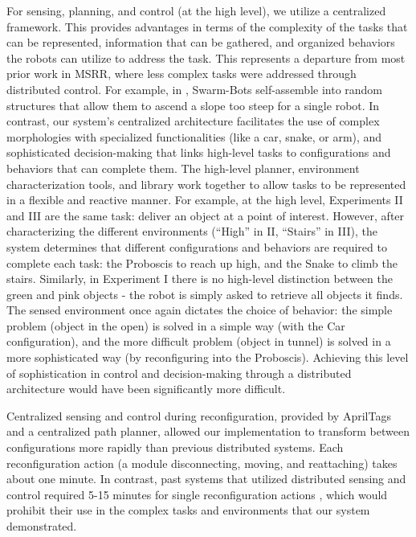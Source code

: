 \documentclass[12pt]{article}
\begin{document}
For sensing, planning, and control (at the high level), we utilize a centralized framework.  This provides advantages in terms of the complexity of the tasks that can be represented, information that can be gathered, and organized behaviors the robots can utilize to address the task.
This represents a departure from most prior work in MSRR, where less complex tasks
were addressed through distributed control.  For example, in \cite{o2010self}, Swarm-Bots self-assemble into random structures that allow them to ascend a slope too steep for a single robot.  In contrast, our system's centralized architecture facilitates the use of complex morphologies with specialized functionalities (like a car, snake, or arm), and sophisticated decision-making that links high-level tasks to configurations and behaviors that can complete them.
The high-level planner, environment characterization tools, and library work together to allow tasks to be represented in a flexible and reactive manner. For example, at the high level, Experiments II and III are the same task: deliver an object at a point of interest.  However, after characterizing the different environments (``High'' in II, ``Stairs'' in III), the system determines that different configurations and behaviors are required to complete each task:  the Proboscis to reach up high, and the Snake to climb the stairs.  
Similarly, in Experiment I there is no high-level distinction between the green and pink objects - the robot is simply asked to retrieve all objects it finds.  The sensed environment once again dictates the choice of behavior: the simple problem (object in the open) is solved in a simple way (with the Car configuration), and the more difficult problem (object in tunnel) is solved in a more sophisticated way (by reconfiguring into the Proboscis).  Achieving this level of sophistication in control and decision-making through a distributed architecture would have been significantly more difficult.

Centralized sensing and control during reconfiguration, provided by AprilTags and a centralized path planner, allowed our implementation to transform between configurations more rapidly than previous distributed systems. 
Each reconfiguration action (a module disconnecting, moving, and reattaching) takes about one minute.  In contrast, past systems that utilized distributed sensing and control required 5-15 minutes for single reconfiguration actions \cite{Yim2007, Rubenstein2004,Murata2006}, which would prohibit their use in the complex tasks and environments that our system demonstrated.
\end{document}
